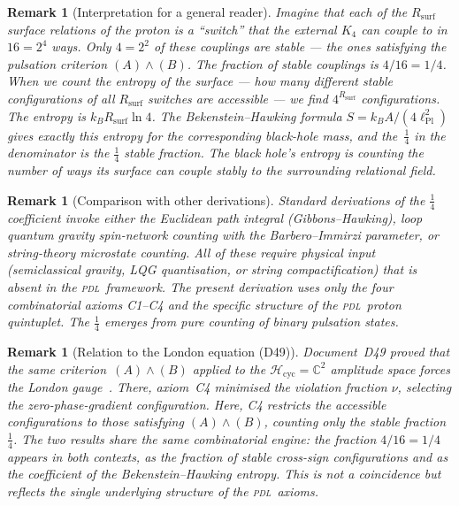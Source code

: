 \documentclass[12pt,a4paper]{article}
\newcommand{\Hcyc}{\mathcal{H}_{\mathrm{cyc}}}
\newtheorem{remark}[theorem]{Remark}
\newcommand{\Kfour}{K_4}
\newcommand{\PDL}{\textsc{pdl}}
\newcommand{\Rsurf}{R_{\mathrm{surf}}}
\newcommand{\lPl}{\ell_{\mathrm{Pl}}}
\begin{document}
\begin{remark}[Interpretation for a general reader]
Imagine that each of the $\Rsurf$ surface relations of the proton is a ``switch'' that the external $\Kfour$ can couple to in $16 = 2^4$ ways. Only $4 = 2^2$ of these couplings are stable — the ones satisfying the pulsation criterion $(A)\wedge(B)$. The fraction of stable couplings is $4/16 = 1/4$. When we count the entropy of the surface — how many different stable configurations of all $\Rsurf$ switches are accessible — we find $4^{\Rsurf}$ configurations. The entropy is $k_B\Rsurf\ln 4$. The Bekenstein--Hawking formula $S = k_B A/(4\lPl^2)$ gives exactly this entropy for the corresponding black-hole mass, and the~$\tfrac{1}{4}$ in the denominator is the $\tfrac{1}{4}$ stable fraction. The black hole's entropy is counting the number of ways its surface can couple stably to the surrounding relational field.
\end{remark}

\begin{remark}[Comparison with other derivations]
Standard derivations of the $\tfrac{1}{4}$ coefficient invoke either the Euclidean path integral (Gibbons--Hawking), loop quantum gravity spin-network counting with the Barbero--Immirzi parameter, or string-theory microstate counting. All of these require physical input (semiclassical gravity, LQG quantisation, or string compactification) that is absent in the \PDL\ framework. The present derivation uses only the four combinatorial axioms C1--C4 and the specific structure of the \PDL\ proton quintuplet. The $\tfrac{1}{4}$ emerges from pure counting of binary pulsation states.
\end{remark}

\begin{remark}[Relation to the London equation (D49)]
Document~D49 proved that the same criterion~$(A)\wedge(B)$ applied to the $\Hcyc = \mathbb{C}^2$ amplitude space forces the London gauge~\cite{PDL_D49_2026}. There, axiom~C4 minimised the violation fraction $\nu$, selecting the zero-phase-gradient configuration. Here, C4 restricts the accessible configurations to those satisfying $(A)\wedge(B)$, counting only the stable fraction $\tfrac{1}{4}$. The two results share the same combinatorial engine: the fraction $4/16 = 1/4$ appears in both contexts, as the fraction of stable cross-sign configurations and as the coefficient of the Bekenstein--Hawking entropy. This is not a coincidence but reflects the single underlying structure of the \PDL\ axioms.
\end{remark}
\end{document}
